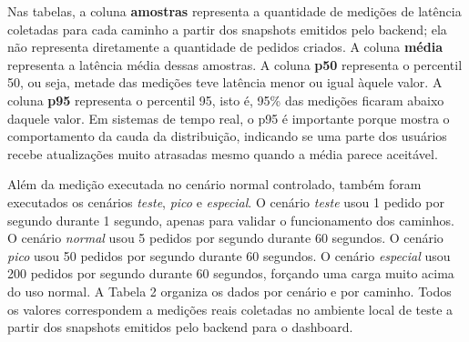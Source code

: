 ﻿\documentclass{article}
\begin{document}
Nas tabelas, a coluna \textbf{amostras} representa a quantidade de medi\c{c}\~oes de lat\^encia coletadas para cada caminho a partir dos snapshots emitidos pelo backend; ela n\~ao representa diretamente a quantidade de pedidos criados. A coluna \textbf{m\'edia} representa a lat\^encia m\'edia dessas amostras. A coluna \textbf{p50} representa o percentil 50, ou seja, metade das medi\c{c}\~oes teve lat\^encia menor ou igual \`aquele valor. A coluna \textbf{p95} representa o percentil 95, isto \'e, 95\% das medi\c{c}\~oes ficaram abaixo daquele valor. Em sistemas de tempo real, o p95 \'e importante porque mostra o comportamento da cauda da distribui\c{c}\~ao, indicando se uma parte dos usu\'arios recebe atualiza\c{c}\~oes muito atrasadas mesmo quando a m\'edia parece aceit\'avel.

\begin{table}[h]
\centering
\caption{Comparativo de lat\^encia dos caminhos em tempo real}
\end{table}

Al\'em da medi\c{c}\~ao executada no cen\'ario normal controlado, tamb\'em foram executados os cen\'arios \textit{teste}, \textit{pico} e \textit{especial}. O cen\'ario \textit{teste} usou 1 pedido por segundo durante 1 segundo, apenas para validar o funcionamento dos caminhos. O cen\'ario \textit{normal} usou 5 pedidos por segundo durante 60 segundos. O cen\'ario \textit{pico} usou 50 pedidos por segundo durante 60 segundos. O cen\'ario \textit{especial} usou 200 pedidos por segundo durante 60 segundos, for\c{c}ando uma carga muito acima do uso normal. A Tabela 2 organiza os dados por cen\'ario e por caminho. Todos os valores correspondem a medi\c{c}\~oes reais coletadas no ambiente local de teste a partir dos snapshots emitidos pelo backend para o dashboard.
\end{document}
